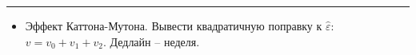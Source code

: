

\par\noindent\rule{\textwidth}{0.4pt}

\begin{itemize}
    \item Эффект Каттона-Мутона. Вывести квадратичную поправку к $\hat{\varepsilon}$: $v = v_0 + v_1 + v_2$. Дедлайн -- неделя.
\end{itemize}
